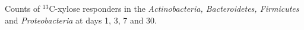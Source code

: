 Counts of $^{13}$C-xylose responders in the \textit{Actinobacteria, Bacteroidetes, Firmicutes} and \textit{Proteobacteria} at days 1, 3, 7 and 30.